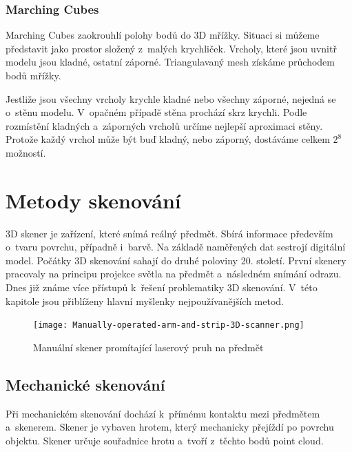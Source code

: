 \documentclass[12pt]{report}			%
\begin{document}
                \subsection{Marching Cubes}

                    Marching Cubes zaokrouhlí polohy bodů do 3D mřížky. Situaci si můžeme představit jako prostor složený z~malých krychliček. Vrcholy, které jsou uvnitř modelu jsou kladné, ostatní záporné. Triangulavaný mesh získáme průchodem bodů mřížky.
    
                    Jestliže jsou všechny vrcholy krychle kladné nebo všechny záporné, nejedná se o~stěnu modelu. V~opačném případě stěna prochází skrz krychli. Podle rozmístění kladných a~záporných vrcholů určíme nejlepší aproximaci stěny. Protože každý vrchol může být buď kladný, nebo záporný, dostáváme celkem $2^8$ možností. \cite{marchingCubes}

        \chapter{Metody skenování}

            3D skener je zařízení, které snímá reálný předmět. Sbírá informace především o~tvaru povrchu, případně i~barvě. Na základě naměřených dat sestrojí digitální model. Počátky 3D skenování sahají do druhé poloviny 20. století. První skenery pracovaly na principu projekce světla na předmět a~následném snímání odrazu. Dnes již známe více přístupů k~řešení problematiky 3D skenování. V~této kapitole jsou přiblíženy hlavní myšlenky nejpoužívanějších metod. \cite{uvod_do_3d_skenovani}

            \begin{figure}[h]
                \centering
                \texttt{[image: Manually-operated-arm-and-strip-3D-scanner.png]}
                \caption{Manuální skener promítající laserový pruh na předmět \cite{firstScanning}}
            \end{figure}

			\section{Mechanické skenování}

                Při mechanickém skenování dochází k~přímému kontaktu mezi předmětem a~skenerem. Skener je vybaven hrotem, který mechanicky přejíždí po povrchu objektu. Skener určuje souřadnice hrotu a~tvoří z~těchto bodů point cloud. \cite{mapovaniporostredi}
\end{document}
